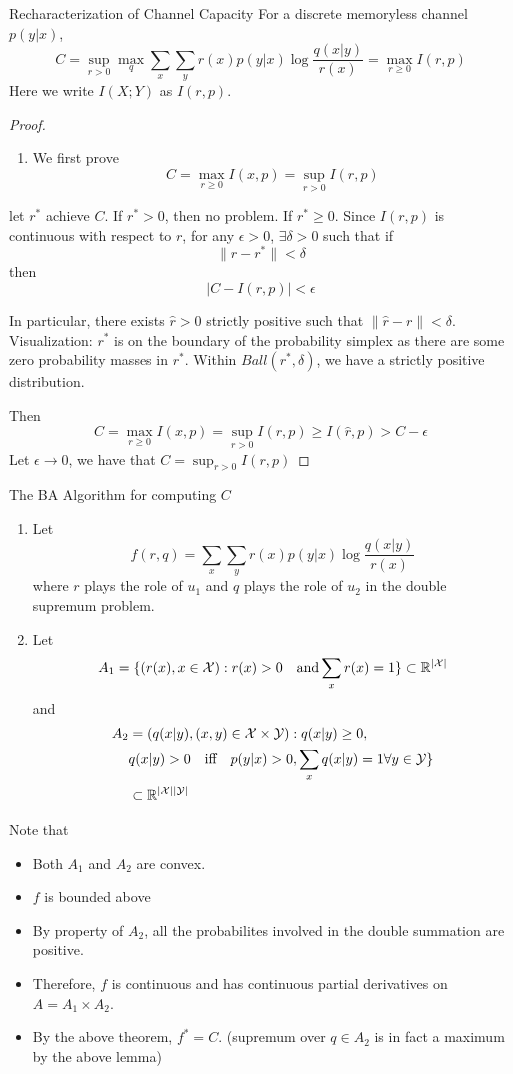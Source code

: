 \documentclass[../main.tex]{subfiles}
\begin{document}
\begin{bbox}{Recharacterization of Channel Capacity}
    For a discrete memoryless channel $p(y|x)$,\[
    C=\sup_{r>0}\max_q \sum_x\sum_y r(x)p(y|x)\log \frac{q(x|y)}{r(x)} = \max_{r\geq 0}I(r,p)
    \]
    Here we write $I(X;Y)$ as $I(r,p)$.
    \begin{proof}
        \begin{enumerate}
            \item We first prove \[
            C=\max_{r\geq 0}I(x,p) = \sup_{r>0} I(r,p)
            \]
        \end{enumerate}
        \item let $r^*$ achieve $C$. If $r^* > 0$, then no problem. If $r^*\geq 0$. Since $I(r,p)$ is continuous with respect to $r$, for any $\epsilon > 0$, $\exists \delta >0$ such that if \[
        \| r-r^*\| < \delta
        \] then \[
        |C - I(r,p)|<\epsilon
        \]
        \item In particular, there exists $\hat r>0$ strictly positive such that $\|\hat r-r\|<\delta$. Visualization: $r^*$ is on the boundary of the probability simplex as there are some zero probability masses in $r^*$. Within $Ball(r^*, \delta)$, we have a strictly positive distribution.
        \item Then \[
        C= \max_{r\geq 0}I(x,p) = \sup_{r>0} I(r,p) \geq I(\hat r,p) > C-\epsilon
        \]
        Let $\epsilon\to 0$, we have that $C=\sup_{r>0}I(r,p)$
    \end{proof}
\end{bbox}
\begin{bbox}{The BA Algorithm for computing $C$}
    \begin{enumerate}
        \item Let \[
    f(r,q) = \sum_x\sum_y r(x)p(y|x)\log \frac{q(x|y)}{r(x)}
    \]
    where $r$ plays the role of $u_1$ and $q$ plays the role of $u_2$ in the double supremum problem. 
    \item Let \[
    A_1 = \{(r(x),x\in \mathcal{X}): r(x)>0 \quad \text{and} \sum_xr(x)=1\}\subset \mathbb{R}^{|\mathcal{X}|}
    \] and 
    \begin{align*}
    A_2 &= 
        (q(x|y), (x,y)\in \mathcal{X}\times\mathcal{Y}):q(x|y)\geq 0,\\
        &q(x|y)>0 \quad \text{iff}\quad p(y|x)>0, \sum_x q(x|y)=1\forall y\in \mathcal{Y}\}\\
        &\subset \mathbb{R}^{|\mathcal{X}||\mathcal{Y}|}    
    \end{align*}
    \end{enumerate}
    Note that
    \begin{itemize}
        \item Both $A_1$ and $A_2$ are convex.
        \item $f$ is bounded above
        \item By property of $A_2$, all the probabilites involved in the double summation are positive.
        \item Therefore, $f$ is continuous and has continuous partial derivatives on $A=A_1\times A_2$.
        \item By the above theorem, $f^*=C$. (supremum over $q\in A_2$ is in fact a maximum by the above lemma)
    \end{itemize}
\end{bbox} 
\end{document}
